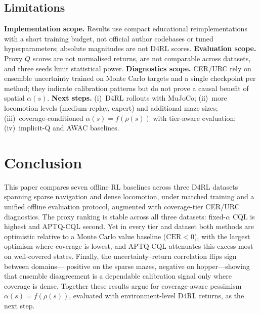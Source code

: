\documentclass[conference]{IEEEtran}
\begin{document}
\subsection{Limitations}

\textbf{Implementation scope.} Results use compact educational
reimplementations with a short training budget, not official author
codebases or tuned hyperparameters; absolute magnitudes are not D4RL scores.
\textbf{Evaluation scope.} Proxy $Q$ scores are not normalised returns, are
not comparable across datasets, and three seeds limit statistical power.
\textbf{Diagnostics scope.} CER/URC rely on ensemble uncertainty trained on
Monte Carlo targets and a single checkpoint per method; they indicate
calibration patterns but do not prove a causal benefit of spatial
$\alpha(s)$. \textbf{Next steps.} (i)~D4RL rollouts with MuJoCo; (ii)~more
locomotion levels (medium-replay, expert) and additional maze sizes;
(iii)~coverage-conditioned $\alpha(s){=}f(\rho(s))$ with tier-aware
evaluation; (iv)~implicit-Q and AWAC baselines.

\section{Conclusion}
\label{sec:conclusion}

This paper compares seven offline RL baselines across three D4RL datasets
spanning sparse navigation and dense locomotion, under matched training and a
unified offline evaluation protocol, augmented with coverage-tier CER/URC
diagnostics. The proxy ranking is stable across all three datasets:
fixed-$\alpha$ CQL is highest and APTQ-CQL second. Yet in every tier and
dataset both methods are optimistic relative to a Monte Carlo value
baseline ($\mathrm{CER}{<}0$), with the largest optimism where coverage is
lowest, and APTQ-CQL attenuates this excess most on well-covered states.
Finally, the uncertainty--return correlation flips sign between domains---
positive on the sparse mazes, negative on hopper---showing that ensemble
disagreement is a dependable calibration signal only where coverage is
dense. Together these results argue for coverage-aware pessimism
$\alpha(s){=}f(\rho(s))$, evaluated with environment-level D4RL returns, as
the next step.
\end{document}
